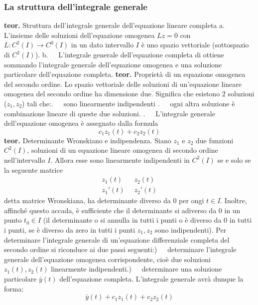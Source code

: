 \subsubsection{La struttura dell'integrale generale}
\textbf{teor.} Struttura dell'integrale generale dell'equazione lineare completa \newline
a. $\;\;\;$ L'insieme delle soluzioni dell'equazione omogenea $Lz = 0 $ con $L:C^2(I)\rightarrow C^0(I)$ in un dato intervallo $I$ è uno spazio vettoriale (sottospazio di $C^2(I)$).\newline
b. $\;\;\;$ L'integrale generale dell'equazione completa di ottiene sommando l'integrale generale dell'equazione omogenea e una soluzione particolare dell'equazione completa.\newline
\newline
\textbf{teor.} Proprietà di un equazione omogenea del secondo ordine.\newline
Lo spazio vettoriale delle soluzioni di un'equazione lineare omogenea del secondo ordine ha dimensione due.\newline
Significa che esistono $2$ soluzioni ($z_1, z_2$) tali che:. $\;\;\;$ sono linearmente indipendenti . $\;\;\;$ ogni altra soluzione è combinazione lineare di queste due soluzioni. . $\;\;\;$ L'integrale generale dell'equazione omogenea è assegnato dalla formula
\[
    c_1 z_1(t) + c_2 z_2(t)
\]
\newline
\textbf{teor.} Determinante Wronskiano e indipendenza. \newline
Siano $z_1$ e $z_2$ due funzioni $C^2(I)$, soluzioni di un equazione lineare omogenea di secondo ordine nell'intervallo $I$. Allora esse sono linearmente indipendenti in $C^2(I)$ se e solo se la seguente matrice
\[
    \begin{matrix}
        z_1(t) \;\; & z_2(t)\\
        z_1'(t) \;\; & z_2'(t)
    \end{matrix}
\]
detta matrice Wronskiana, ha determinante diverso da $0$ per ongi $t \in I$. Inoltre, affinché questo accada, è sufficiente che il determinante si adiverso da $0$ in un punto $t_0 \in I$ (il determinante o si annulla in tutti i punti o è diverso da $0$ in tutti i punti, se è diverso da zero in tutti i punti $z_1, z_2$ sono indipendenti).\newline
\newline
Per determinare l'integrale generale di un'equazione differenziale completa del secondo ordine si riconduce ai due passi seguenti:) $\;\;\;$ determinare l'integrale generale dell'equazione omogenea corrispondente, cioè due soluzioni $z_1(t), z_2(t)$ linearmente indipendenti.) $\;\;\;$ determinare una soluzione particolare $\bar{y}(t)$ dell'equazione completa.\newline
L'integrale generale avrà dunque la forma:
\[
    \bar{y}(t) + c_1 z_1(t) + c_2 z_2(t)
\]
